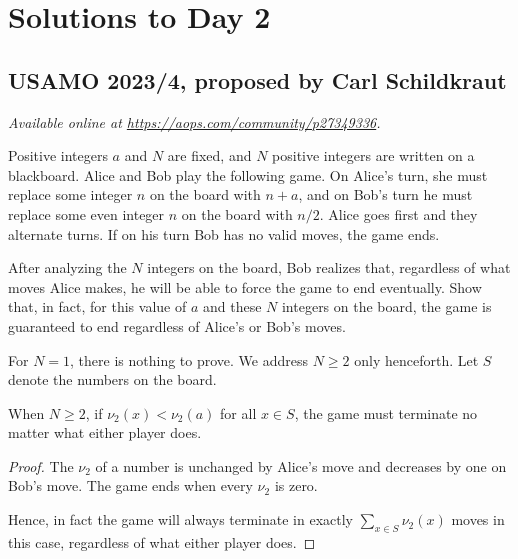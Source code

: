 \documentclass[11pt]{scrartcl}
\begin{document}
\section{Solutions to Day 2}
\subsection{USAMO 2023/4, proposed by Carl Schildkraut}
\textsl{Available online at \url{https://aops.com/community/p27349336}.}
\begin{mdframed}[style=mdpurplebox,frametitle={Problem statement}]
Positive integers $a$ and $N$ are fixed,
and $N$ positive integers are written on a blackboard.
Alice and Bob play the following game.
On Alice's turn, she must replace some integer $n$ on the board with $n+a$,
and on Bob's turn he must replace some even integer $n$ on the board with $n/2$.
Alice goes first and they alternate turns.
If on his turn Bob has no valid moves, the game ends.

After analyzing the $N$ integers on the board, Bob realizes that,
regardless of what moves Alice makes,
he will be able to force the game to end eventually.
Show that, in fact, for this value of $a$ and these $N$ integers on the board,
the game is guaranteed to end regardless of Alice's or Bob's moves.
\end{mdframed}
For $N=1$, there is nothing to prove.
We address $N \ge 2$ only henceforth.
Let $S$ denote the numbers on the board.

\begin{claim*}
  When $N \ge 2$, if $\nu_2(x) < \nu_2(a)$ for all $x \in S$,
  the game must terminate no matter what either player does.
\end{claim*}
\begin{proof}
  The $\nu_2$ of a number is unchanged by Alice's move
  and decreases by one on Bob's move.
  The game ends when every $\nu_2$ is zero.

  Hence, in fact the game will always terminate in exactly
  $\sum_{x \in S} \nu_2(x)$ moves in this case,
  regardless of what either player does.
\end{proof}
\end{document}
